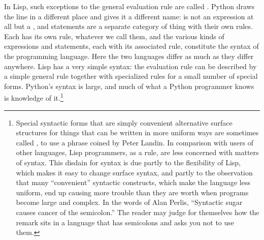 In Lisp, such exceptions to the general evaluation rule are called
.  Python draws the line in a different place and gives
it a different name:  is not an expression at all but a
, and statements are a separate category of thing with their
own rules.  Each has its own rule, whatever we call them, and the various kinds
of expressions and statements, each with its associated rule, constitute the
syntax of the programming language.  Here the two languages differ as much as
they differ anywhere.  Lisp has a very simple syntax: the evaluation rule can
be described by a simple general rule together with specialized rules for a
small number of special forms.  Python's syntax is large, and much of what a
Python programmer knows is knowledge of it.\footnote{Special syntactic forms
that are simply convenient alternative surface structures for things that can
be written in more uniform ways are sometimes called ,
to use a phrase coined by Peter Landin.  In comparison with users of other
languages, Lisp programmers, as a rule, are less concerned with matters of
syntax.  This disdain for syntax is due partly to the flexibility of Lisp,
which makes it easy to change surface syntax, and partly to the observation
that many ``convenient'' syntactic constructs, which make the language less
uniform, end up causing more trouble than they are worth when programs become
large and complex.  In the words of Alan Perlis, ``Syntactic sugar causes
cancer of the semicolon.''  The reader may judge for themselves how the remark
sits in a language that has semicolons and asks you not to use them.}
